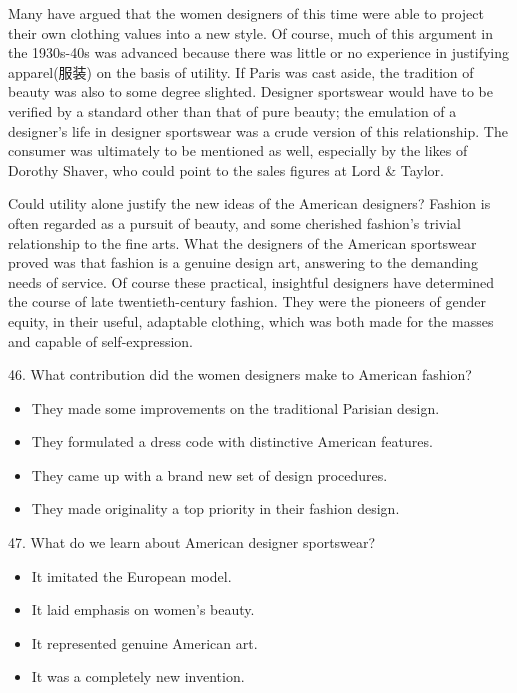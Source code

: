 \documentclass[UTF8,11pt]{ctexart}
\begin{document}
Many have argued that the women designers of this time were able to project their own clothing values into a new style. Of course, much of this argument in the 1930s-40s was advanced because there was little or no experience in justifying apparel(服装) on the basis of utility. If Paris was cast aside, the tradition of beauty was also to some degree slighted. Designer sportswear would have to be verified by a standard other than that of pure beauty; the emulation of a designer’s life in designer sportswear was a crude version of this relationship. The consumer was ultimately to be mentioned as well, especially by the likes of Dorothy Shaver, who could point to the sales figures at Lord \& Taylor.


Could utility alone justify the new ideas of the American designers? Fashion is often regarded as a pursuit of beauty, and some cherished fashion’s trivial relationship to the fine arts. What the designers of the American sportswear proved was that fashion is a genuine design art, answering to the demanding needs of service. Of course these practical, insightful designers have determined the course of late twentieth-century fashion. They were the pioneers of gender equity, in their useful, adaptable clothing, which was both made for the masses and capable of self-expression.


46. What contribution did the women designers make to American fashion?


\begin{itemize}[leftmargin=2em,itemsep=.2em,topsep=.4em]\item[A.] They made some improvements on the traditional Parisian design.
\item[B.] They formulated a dress code with distinctive American features.
\item[C.] They came up with a brand new set of design procedures.
\item[D.] They made originality a top priority in their fashion design.
\end{itemize}

47. What do we learn about American designer sportswear?


\begin{itemize}[leftmargin=2em,itemsep=.2em,topsep=.4em]\item[A.] It imitated the European model.
\item[B.] It laid emphasis on women’s beauty.
\item[C.] It represented genuine American art.
\item[D.] It was a completely new invention.
\end{itemize}
\end{document}
